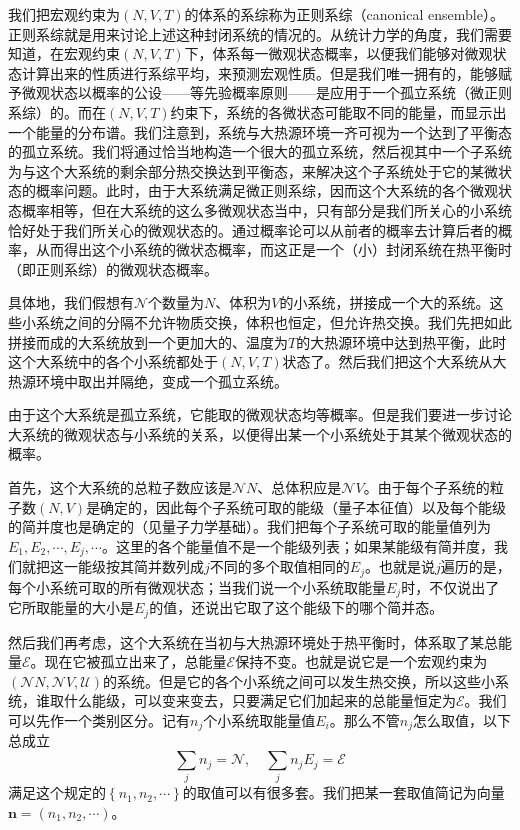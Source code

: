 \documentclass[main.tex]{subfiles}
\begin{document}
我们把宏观约束为$\left(N,V,T\right)$的体系的系综称为正则系综（canonical ensemble）。正则系综就是用来讨论上述这种封闭系统的情况的。从统计力学的角度，我们需要知道，在宏观约束$\left(N,V,T\right)$下，体系每一微观状态概率，以便我们能够对微观状态计算出来的性质进行系综平均，来预测宏观性质。但是我们唯一拥有的，能够赋予微观状态以概率的公设——等先验概率原则——是应用于一个孤立系统（微正则系综）的。而在$\left(N,V,T\right)$约束下，系统的各微状态可能取不同的能量，而显示出一个能量的分布谱。我们注意到，系统与大热源环境一齐可视为一个达到了平衡态的孤立系统。我们将通过恰当地构造一个很大的孤立系统，然后视其中一个子系统为与这个大系统的剩余部分热交换达到平衡态，来解决这个子系统处于它的某微状态的概率问题。此时，由于大系统满足微正则系综，因而这个大系统的各个微观状态概率相等，但在大系统的这么多微观状态当中，只有部分是我们所关心的小系统恰好处于我们所关心的微观状态的。通过概率论可以从前者的概率去计算后者的概率，从而得出这个小系统的微状态概率，而这正是一个（小）封闭系统在热平衡时（即正则系综）的微观状态概率。

具体地，我们假想有$\mathcal{N}$个数量为$N$、体积为$V$的小系统，拼接成一个大的系统。这些小系统之间的分隔不允许物质交换，体积也恒定，但允许热交换。我们先把如此拼接而成的大系统放到一个更加大的、温度为$T$的大热源环境中达到热平衡，此时这个大系统中的各个小系统都处于$\left(N,V,T\right)$状态了。然后我们把这个大系统从大热源环境中取出并隔绝，变成一个孤立系统。

由于这个大系统是孤立系统，它能取的微观状态均等概率。但是我们要进一步讨论大系统的微观状态与小系统的关系，以便得出某一个小系统处于其某个微观状态的概率。

首先，这个大系统的总粒子数应该是$\mathcal{N}N$、总体积应是$\mathcal{N}V$。由于每个子系统的粒子数$\left(N,V\right)$是确定的，因此每个子系统可取的能级（量子本征值）以及每个能级的简并度也是确定的（见量子力学基础）。我们把每个子系统可取的能量值列为$E_1,E_2,\cdots,E_j,\cdots$。这里的各个能量值不是一个能级列表；如果某能级有简并度，我们就把这一能级按其简并数列成$j$不同的多个取值相同的$E_j$。也就是说$j$遍历的是，每个小系统可取的所有微观状态；当我们说一个小系统取能量$E_j$时，不仅说出了它所取能量的大小是$E_j$的值，还说出它取了这个能级下的哪个简并态。

然后我们再考虑，这个大系统在当初与大热源环境处于热平衡时，体系取了某总能量$\mathcal{E}$。现在它被孤立出来了，总能量$\mathcal{E}$保持不变。也就是说它是一个宏观约束为$\left(\mathcal{N}N,\mathcal{N}V,\mathcal{U}\right)$的系统。但是它的各个小系统之间可以发生热交换，所以这些小系统，谁取什么能级，可以变来变去，只要满足它们加起来的总能量恒定为$\mathcal{E}$。我们可以先作一个类别区分。记有$n_j$个小系统取能量值$E_i$。那么不管$n_j$怎么取值，以下总成立
\begin{equation}\label{eq:V.2_canonical_ensemble_constraints}
    \sum_jn_j=\mathcal{N},\quad\sum_jn_jE_j=\mathcal{E}
\end{equation}
满足这个规定的$\left\{n_1,n_2,\cdots\right\}$的取值可以有很多套。我们把某一套取值简记为向量$\mathbf{n}=\left(n_1,n_2,\cdots\right)$。
\end{document}
